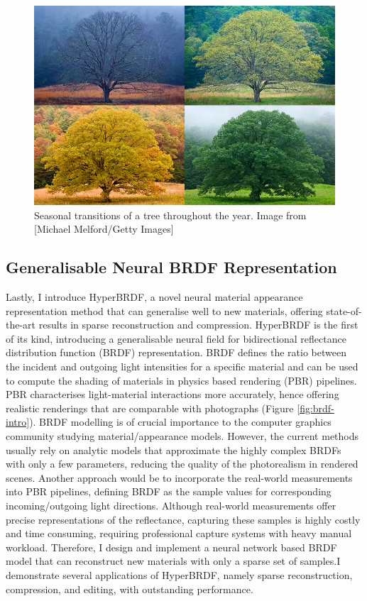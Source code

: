 \begin{figure}[ht]
  \centering

    \includegraphics[width=0.76\linewidth]{Images/seasonchanges.png}

   \caption{Seasonal transitions of a tree throughout the year. Image from [Michael Melford/Getty Images]}
   \label{fig:colour-approximate}
\end{figure}

\subsection{Generalisable Neural BRDF Representation}
Lastly, I introduce HyperBRDF, a novel neural material appearance representation method that can generalise well to new materials, offering state-of-the-art results in sparse reconstruction and compression. HyperBRDF is the first of its kind, introducing a generalisable neural field for bidirectional reflectance distribution function (BRDF) representation. BRDF defines the ratio between the incident and outgoing light intensities for a specific material and can be used to compute the shading of materials in physics based rendering (PBR) pipelines. PBR characterises light-material interactions more accurately, hence offering realistic renderings that are comparable with photographs (Figure \ref{fig:brdf-intro}). BRDF modelling is of crucial importance to the computer graphics community studying material/appearance models. However, the current methods usually rely on analytic models that approximate the highly complex BRDFs with only a few parameters, reducing the quality of the photorealism in rendered scenes. Another approach would be to incorporate the real-world measurements into PBR pipelines, defining BRDF as the sample values for corresponding incoming/outgoing light directions. Although real-world measurements offer precise representations of the reflectance, capturing these samples is highly costly and time consuming, requiring professional capture systems with heavy manual workload. Therefore, I design and implement a neural network based BRDF model that can reconstruct new materials with only a sparse set of samples.I demonstrate several applications of HyperBRDF, namely sparse reconstruction, compression, and editing, with outstanding performance. 


